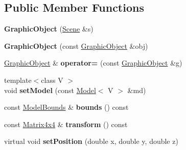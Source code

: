 \subsection*{Public Member Functions}
\begin{DoxyCompactItemize}
\item 
\hypertarget{class_tempest_1_1_graphic_object_a8bd08f5548374eb91b33812747ff6284}{{\bfseries Graphic\+Object} (\hyperlink{class_tempest_1_1_abstract_scene}{Scene} \&s)}\label{class_tempest_1_1_graphic_object_a8bd08f5548374eb91b33812747ff6284}

\item 
\hypertarget{class_tempest_1_1_graphic_object_a7ac61ff9474025d9d18d76d9c3deff32}{{\bfseries Graphic\+Object} (const \hyperlink{class_tempest_1_1_graphic_object}{Graphic\+Object} \&obj)}\label{class_tempest_1_1_graphic_object_a7ac61ff9474025d9d18d76d9c3deff32}

\item 
\hypertarget{class_tempest_1_1_graphic_object_ab7779a7b30d0b32051dc48149909d708}{\hyperlink{class_tempest_1_1_graphic_object}{Graphic\+Object} \& {\bfseries operator=} (const \hyperlink{class_tempest_1_1_graphic_object}{Graphic\+Object} \&g)}\label{class_tempest_1_1_graphic_object_ab7779a7b30d0b32051dc48149909d708}

\item 
\hypertarget{class_tempest_1_1_graphic_object_a685481826e5ce876ff28c67a9b2a4b09}{{\footnotesize template$<$class V $>$ }\\void {\bfseries set\+Model} (const \hyperlink{class_tempest_1_1_model}{Model}$<$ V $>$ \&md)}\label{class_tempest_1_1_graphic_object_a685481826e5ce876ff28c67a9b2a4b09}

\item 
\hypertarget{class_tempest_1_1_graphic_object_a5a9915e2a2c8fca687e87928bc9219e9}{const \hyperlink{struct_tempest_1_1_model_bounds}{Model\+Bounds} \& {\bfseries bounds} () const }\label{class_tempest_1_1_graphic_object_a5a9915e2a2c8fca687e87928bc9219e9}

\item 
\hypertarget{class_tempest_1_1_graphic_object_a395e630eee08bffd4076be471b23a421}{const \hyperlink{class_tempest_1_1_matrix4x4}{Matrix4x4} \& {\bfseries transform} () const }\label{class_tempest_1_1_graphic_object_a395e630eee08bffd4076be471b23a421}

\item 
\hypertarget{class_tempest_1_1_graphic_object_a05248a0f457a84c3265dcbc1f775891e}{virtual void {\bfseries set\+Position} (double x, double y, double z)}\label{class_tempest_1_1_graphic_object_a05248a0f457a84c3265dcbc1f775891e}


\end{DoxyCompactItemize}
